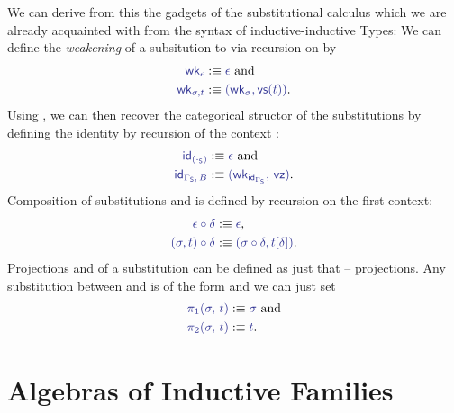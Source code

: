 \begin{defn}
We can derive from this the gadgets of the substitutional calculus which we
are already acquainted with from the syntax of inductive-inductive Types:
We can define the \emph{weakening} of a subsitution
\tqm{\IFSub{\sigma}{\Gamma_\Sc}{\Delta_\Sc}} to 
 via recursion on \tqm{\sigma} by
\begin{align*}
\tqm{\wk_\epsilon} 				&:\equiv \tqm{\epsilon} \text{ and} \\
\tqm{\wk_{\sigma, t}}				&:\equiv \tqm{(\wk_\sigma, \vs(t))} \text{.}
\end{align*}
Using \tqm{\wk}, we can then recover the categorical structor of the substitutions
by defining the identity \tqm{\IFSub{\id_{\Gamma_\Sc}}{\Gamma_\Sc}{\Gamma_\Sc}}
by recursion of the context \tqm{\Gamma_\Sc}:
\begin{align*}
\tqm{\id_{(\cdot_\Sc)}}				&:\equiv \tqm{\epsilon} \text{ and} \\
\tqm{\id_{\Gamma_\Sc,\, B}}			&:\equiv \tqm{(\wk_{\id_{\Gamma_\Sc}},\, \vz)} \text{.}
\end{align*}
Composition \tqm{\IFSub{\sigma \circ \delta}{\Gamma_\Sc}{\Sigma_\Sc}} of substitutions
\tqm{\IFSub{\sigma}{\Delta_\Sc}{\Sigma_\Sc}} and \tqm{\IFSub{\delta}{\Gamma_\Sc}{\Delta_\Sc}}
is defined by recursion on the first context:
\begin{align*}
\tqm{\epsilon \circ \delta}			&:\equiv \tqm{\epsilon} \text{,} \\
\tqm{(\sigma, t) \circ \delta}			&:\equiv \tqm{(\sigma \circ \delta, t[\delta])} \text{.}
\end{align*}
Projections  and
 of a substitution
 can be defined as just that --
projections.
Any substitution between \tqm{\Gamma_\Sc} and  is of the form
 and we can just set
\begin{align*}
\tqm{\pi_1(\sigma,\, t)}				&:\equiv \tqm{\sigma} \text{ and} \\
\tqm{\pi_2(\sigma,\, t)}				&:\equiv \tqm{t} \text{.}
\end{align*}
\end{defn}


\section{Algebras of Inductive Families}\label{sec:if-alg}

